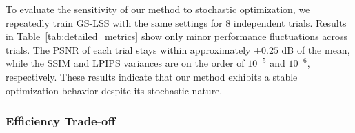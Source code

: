 \documentclass[lettersize,journal]{IEEEtran}
\begin{document}
To evaluate the sensitivity of our method to stochastic optimization, we repeatedly train GS-LSS with the same settings for 8 independent trials.
Results in Table~\ref{tab:detailed_metrics} show only minor performance fluctuations across trials. The PSNR of each trial stays within approximately $\pm 0.25$ dB of the mean, while the SSIM and LPIPS variances are on the order of $10^{-5}$ and $10^{-6}$, respectively. These results indicate that our method exhibits a stable optimization behavior despite its stochastic nature.


\subsubsection{Efficiency Trade-off}


\begin{table}[h]
\centering
\caption{Average training time and rendering quality comparison on Tanks \& Temples~\cite{tankstemples} with a 60$^\circ$ coverage gap.}
\label{tab:training-time}
\setlength{\tabcolsep}{3pt}
\end{table}
\end{document}
